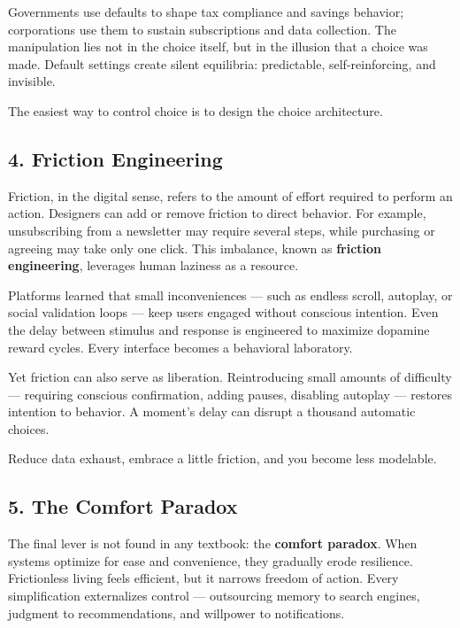 \documentclass[12pt,twoside]{book}
\begin{document}
Governments use defaults to shape tax compliance and savings behavior; corporations use them to sustain subscriptions and data collection.  
The manipulation lies not in the choice itself, but in the illusion that a choice was made.  
Default settings create silent equilibria: predictable, self-reinforcing, and invisible. \\

\begin{keyidea}
The easiest way to control choice is to design the choice architecture.
\end{keyidea}

\subsection*{4. Friction Engineering}

Friction, in the digital sense, refers to the amount of effort required to perform an action.  
Designers can add or remove friction to direct behavior.  
For example, unsubscribing from a newsletter may require several steps, while purchasing or agreeing may take only one click.  
This imbalance, known as \textbf{friction engineering}, leverages human laziness as a resource.  

Platforms learned that small inconveniences --- such as endless scroll, autoplay, or social validation loops --- keep users engaged without conscious intention.  
Even the delay between stimulus and response is engineered to maximize dopamine reward cycles.  
Every interface becomes a behavioral laboratory.

Yet friction can also serve as liberation.  
Reintroducing small amounts of difficulty --- requiring conscious confirmation, adding pauses, disabling autoplay --- restores intention to behavior.  
A moment’s delay can disrupt a thousand automatic choices. \\

\begin{keyidea}
Reduce data exhaust, embrace a little friction, and you become less modelable.
\end{keyidea}

\subsection*{5. The Comfort Paradox}

The final lever is not found in any textbook: the \textbf{comfort paradox}.  
When systems optimize for ease and convenience, they gradually erode resilience.  
Frictionless living feels efficient, but it narrows freedom of action.  
Every simplification externalizes control --- outsourcing memory to search engines, judgment to recommendations, and willpower to notifications.  
\end{document}
